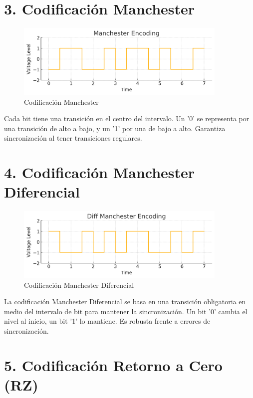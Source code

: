 \documentclass[a4paper,12pt]{article}
\begin{document}
\section*{3. Codificación Manchester}

\begin{figure}[h!]
\centering
\includegraphics[width=0.9\textwidth]{manchester.png}
\caption{Codificación Manchester}
\end{figure}

Cada bit tiene una transición en el centro del intervalo. Un '0' se representa por una transición de alto a bajo, y un '1' por una de bajo a alto. Garantiza sincronización al tener transiciones regulares.


\section*{4. Codificación Manchester Diferencial}

\begin{figure}[h!]
\centering
\includegraphics[width=0.9\textwidth]{diff_manchester.png}
\caption{Codificación Manchester Diferencial}
\end{figure}

La codificación Manchester Diferencial se basa en una transición obligatoria en medio del intervalo de bit para mantener la sincronización. Un bit '0' cambia el nivel al inicio, un bit '1' lo mantiene. Es robusta frente a errores de sincronización.


\section*{5. Codificación Retorno a Cero (RZ)}
\end{document}
